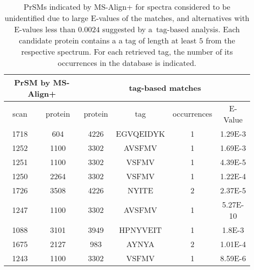 \documentclass{article}
\begin{document}
\begin{landscape}

\begin{table}[h]\footnotesize
\vspace{3mm}\
{\centering
\begin{center}
\begin{tabular}{|c|c||c|c|c|c|}
  \hline
  \multicolumn{2}{|c||}{PrSM by MS-Align+} & \multicolumn{4}{|c|}{tag-based matches} \\
  \hline
  scan & protein & protein & tag & occurrences & E-Value\\

  \hline
1718& 604 & 4226& 
EGVQEIDYK & 1 & 1.29E-3\\
  \hline
1252& 1100 & 3302& 
AVSFMV & 1 & 1.69E-3\\
  \hline
1251& 1100 & 3302& 
VSFMV & 1 & 4.39E-5\\
  \hline
1250& 2264 & 3302& 
VSFMV & 1 & 1.22E-4\\
  \hline
1726& 3508 & 4226& 
NYITE & 2 & 2.37E-5\\
  \hline
1247& 1100 & 3302& 
AVSFMV & 1 & 5.27E-10\\
  \hline
1088& 3101 & 3949& 
HPNYVEIT & 1 & 1.8E-3\\
  \hline
1675& 2127 & 983& 
AYNYA & 2 & 1.01E-4\\
  \hline
1243& 1100 & 3302& 
VSFMV & 1 & 8.59E-6\\
\hline\end{tabular}
\end{center}
\par}
\centering
\caption{PrSMs indicated by MS-Align+ for spectra considered to be unidentified due to large E-values of the matches, and alternatives with E-values less than $0.0024$ suggested by a~tag-based analysis. Each candidate protein contains a a tag of length at least $5$ from the respective spectrum. For each retrieved tag, the number of its occurrences in the database is indicated.}
\vspace{3mm}
\label{table:unident-spectra}
\end{table}
\end{landscape}
\end{document}
